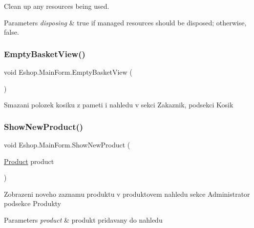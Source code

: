 Clean up any resources being used. 


\begin{DoxyParams}{Parameters}
{\em disposing} & true if managed resources should be disposed; otherwise, false.\\
\hline
\end{DoxyParams}
\mbox{\label{class_eshop_1_1_main_form_a8a308e6f194e975bf24b8ba65e219b5d}} 
\subsubsection{\texorpdfstring{EmptyBasketView()}{EmptyBasketView()}}
{\footnotesize\ttfamily void Eshop.\+Main\+Form.\+Empty\+Basket\+View (\begin{DoxyParamCaption}{ }\end{DoxyParamCaption})}



Smazani polozek kosiku z pameti i nahledu v sekci Zakaznik, podsekci Kosik 

\mbox{\label{class_eshop_1_1_main_form_a41fcf34c450b8a25e599dd1df8b7baf3}} 
\subsubsection{\texorpdfstring{ShowNewProduct()}{ShowNewProduct()}}
{\footnotesize\ttfamily void Eshop.\+Main\+Form.\+Show\+New\+Product (\begin{DoxyParamCaption}\item[{\mbox{\hyperlink{class_eshop_1_1_product}{Product}}}]{product }\end{DoxyParamCaption})}



Zobrazeni noveho zaznamu produktu v produktovem nahledu sekce Administrator podsekce Produkty 


\begin{DoxyParams}{Parameters}
{\em product} & produkt pridavany do nahledu\\
\hline
\end{DoxyParams}
\mbox{\label{class_eshop_1_1_main_form_a213434c5cc934d6885cfaba85ab90fce}} 

